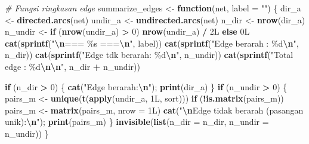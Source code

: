 \documentclass[
  11pt,
]{article}
\newenvironment{Shaded}{\begin{snugshade}}{\end{snugshade}}
\newcommand{\AttributeTok}[1]{\textcolor[rgb]{0.13,0.29,0.53}{#1}}
\newcommand{\CommentTok}[1]{\textcolor[rgb]{0.56,0.35,0.01}{\textit{#1}}}
\newcommand{\ControlFlowTok}[1]{\textcolor[rgb]{0.13,0.29,0.53}{\textbf{#1}}}
\newcommand{\DataTypeTok}[1]{\textcolor[rgb]{0.13,0.29,0.53}{#1}}
\newcommand{\DecValTok}[1]{\textcolor[rgb]{0.00,0.00,0.81}{#1}}
\newcommand{\FunctionTok}[1]{\textcolor[rgb]{0.13,0.29,0.53}{\textbf{#1}}}
\newcommand{\NormalTok}[1]{#1}
\newcommand{\OtherTok}[1]{\textcolor[rgb]{0.56,0.35,0.01}{#1}}
\newcommand{\SpecialCharTok}[1]{\textcolor[rgb]{0.81,0.36,0.00}{\textbf{#1}}}
\newcommand{\StringTok}[1]{\textcolor[rgb]{0.31,0.60,0.02}{#1}}
\begin{document}
\begin{Shaded}
\begin{Highlighting}[]
\CommentTok{\# Fungsi ringkasan edge}
\NormalTok{summarize\_edges }\OtherTok{\textless{}{-}} \ControlFlowTok{function}\NormalTok{(net, }\AttributeTok{label =} \StringTok{""}\NormalTok{) \{}
\NormalTok{  dir\_a   }\OtherTok{\textless{}{-}} \FunctionTok{directed.arcs}\NormalTok{(net)}
\NormalTok{  undir\_a }\OtherTok{\textless{}{-}} \FunctionTok{undirected.arcs}\NormalTok{(net)}
\NormalTok{  n\_dir   }\OtherTok{\textless{}{-}} \FunctionTok{nrow}\NormalTok{(dir\_a)}
\NormalTok{  n\_undir }\OtherTok{\textless{}{-}} \ControlFlowTok{if}\NormalTok{ (}\FunctionTok{nrow}\NormalTok{(undir\_a) }\SpecialCharTok{\textgreater{}} \DecValTok{0}\NormalTok{) }\FunctionTok{nrow}\NormalTok{(undir\_a) }\SpecialCharTok{/} \DecValTok{2}\DataTypeTok{L} \ControlFlowTok{else} \DecValTok{0}\DataTypeTok{L}
  \FunctionTok{cat}\NormalTok{(}\FunctionTok{sprintf}\NormalTok{(}\StringTok{"}\SpecialCharTok{\textbackslash{}n}\StringTok{=== \%s ===}\SpecialCharTok{\textbackslash{}n}\StringTok{"}\NormalTok{, label))}
  \FunctionTok{cat}\NormalTok{(}\FunctionTok{sprintf}\NormalTok{(}\StringTok{"Edge berarah    : \%d}\SpecialCharTok{\textbackslash{}n}\StringTok{"}\NormalTok{, n\_dir))}
  \FunctionTok{cat}\NormalTok{(}\FunctionTok{sprintf}\NormalTok{(}\StringTok{"Edge tdk berarah: \%d}\SpecialCharTok{\textbackslash{}n}\StringTok{"}\NormalTok{, n\_undir))}
  \FunctionTok{cat}\NormalTok{(}\FunctionTok{sprintf}\NormalTok{(}\StringTok{"Total edge      : \%d}\SpecialCharTok{\textbackslash{}n\textbackslash{}n}\StringTok{"}\NormalTok{, n\_dir }\SpecialCharTok{+}\NormalTok{ n\_undir))}

  \ControlFlowTok{if}\NormalTok{ (n\_dir }\SpecialCharTok{\textgreater{}} \DecValTok{0}\NormalTok{) \{}
    \FunctionTok{cat}\NormalTok{(}\StringTok{"Edge berarah:}\SpecialCharTok{\textbackslash{}n}\StringTok{"}\NormalTok{); }\FunctionTok{print}\NormalTok{(dir\_a)}
\NormalTok{  \}}
  \ControlFlowTok{if}\NormalTok{ (n\_undir }\SpecialCharTok{\textgreater{}} \DecValTok{0}\NormalTok{) \{}
\NormalTok{    pairs\_m }\OtherTok{\textless{}{-}} \FunctionTok{unique}\NormalTok{(}\FunctionTok{t}\NormalTok{(}\FunctionTok{apply}\NormalTok{(undir\_a, }\DecValTok{1}\DataTypeTok{L}\NormalTok{, sort)))}
    \ControlFlowTok{if}\NormalTok{ (}\SpecialCharTok{!}\FunctionTok{is.matrix}\NormalTok{(pairs\_m)) pairs\_m }\OtherTok{\textless{}{-}} \FunctionTok{matrix}\NormalTok{(pairs\_m, }\AttributeTok{nrow =} \DecValTok{1}\DataTypeTok{L}\NormalTok{)}
    \FunctionTok{cat}\NormalTok{(}\StringTok{"}\SpecialCharTok{\textbackslash{}n}\StringTok{Edge tidak berarah (pasangan unik):}\SpecialCharTok{\textbackslash{}n}\StringTok{"}\NormalTok{); }\FunctionTok{print}\NormalTok{(pairs\_m)}
\NormalTok{  \}}
  \FunctionTok{invisible}\NormalTok{(}\FunctionTok{list}\NormalTok{(}\AttributeTok{n\_dir =}\NormalTok{ n\_dir, }\AttributeTok{n\_undir =}\NormalTok{ n\_undir))}
\NormalTok{\}}
\end{Highlighting}
\end{Shaded}
\end{document}
